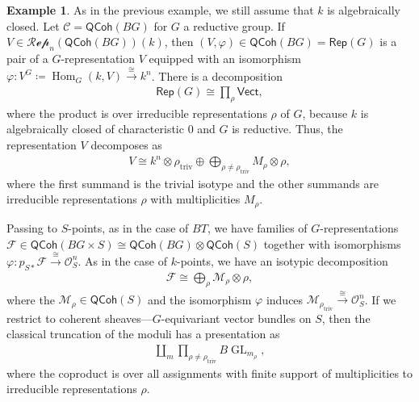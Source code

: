 \documentclass{article}
\numberwithin{equation}{section}
\theoremstyle{quest}
\theoremstyle{definition}
\newtheorem{ex}[thm]{Example}
\theoremstyle{remark}
\DeclareMathOperator{\GL}{GL}
\DeclareMathOperator{\Hom}{Hom}
\begin{document}
\begin{ex}
As in the previous example, we still assume that $k$ is algebraically closed. Let $\mathcal{C}=\mathsf{QCoh}(BG)$ for $G$ a reductive group. If $V\in \mathscr{Rep}_{n}(\mathsf{QCoh}(BG))(k)$, then $(V,\varphi)\in \mathsf{QCoh}(BG)=\mathsf{Rep}(G)$ is a pair of a $G$-representation $V$ equipped with an isomorphism $\varphi:V^G\coloneqq \Hom_G(k,V)\xrightarrow{\cong}k^n$. There is a decomposition
\begin{align*}
	\mathsf{Rep}(G)\cong\prod_{\rho}\mathsf{Vect},
\end{align*} 
where the product is over irreducible representations $\rho$ of $G$, because $k$ is algebraically closed of characteristic 0 and $G$ is reductive. Thus, the representation $V$ decomposes as
\begin{align*}
	V\cong k^n\otimes \rho_{\text{triv}}\oplus \bigoplus _{\rho\neq \rho_{\text{triv}}}M_\rho\otimes \rho,
\end{align*} 
where the first summand is the trivial isotype and the other summands are irreducible representations $\rho$ with multiplicities $M_\rho$.

Passing to $S$-points, as in the case of $BT$, we have families of $G$-representations $\mathscr{F}\in \mathsf{QCoh}(BG\times S)\cong \mathsf{QCoh}(BG)\otimes \mathsf{QCoh}(S)$ together with isomorphisms $\varphi:p_{S*}\mathscr{F}\xrightarrow{\cong}\mathscr{O}^n_{S}$. As in the case of $k$-points, we have an isotypic decomposition
\begin{align*}
	\mathscr{F}\cong \bigoplus _\rho \mathscr{M}_\rho\otimes \rho,
\end{align*} 
where the $\mathscr{M}_\rho\in \mathsf{QCoh}(S)$ and the isomorphism $\varphi$ induces $\mathscr{M}_{\rho_{\text{triv}}}\xrightarrow{\cong}\mathscr{O}^n_S$. If we restrict to coherent sheaves---$G$-equivariant vector bundles on $S$, then the classical truncation of the moduli has a presentation as
\begin{align*}
	\coprod_{m}\prod_{\rho\neq\rho_{\text{triv}}}B\GL_{m_\rho},
\end{align*} 
where the coproduct is over all assignments with finite support of multiplicities to irreducible representations $\rho$.
\end{ex} 
\end{document}
